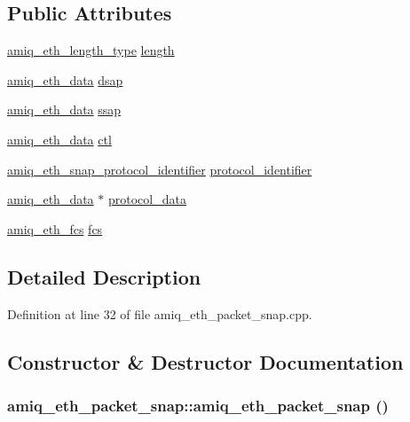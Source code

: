 \subsection*{Public Attributes}
\begin{DoxyCompactItemize}
\item 
\hyperlink{amiq__eth__types_8cpp_a4d2be172e6524c991fe389337947afc0}{amiq\_\-eth\_\-length\_\-type} \hyperlink{classamiq__eth__packet__snap_aab2892c994afa1c55c560ae287f96f19}{length}
\item 
\hyperlink{amiq__eth__types_8cpp_a3595a0a508d433d383d3e5521fc0b723}{amiq\_\-eth\_\-data} \hyperlink{classamiq__eth__packet__snap_a3472137088bb7bc9085610f4f848527f}{dsap}
\item 
\hyperlink{amiq__eth__types_8cpp_a3595a0a508d433d383d3e5521fc0b723}{amiq\_\-eth\_\-data} \hyperlink{classamiq__eth__packet__snap_a6acbe3de6637a59ffae0b491b8567991}{ssap}
\item 
\hyperlink{amiq__eth__types_8cpp_a3595a0a508d433d383d3e5521fc0b723}{amiq\_\-eth\_\-data} \hyperlink{classamiq__eth__packet__snap_ae4146189e20b5d48c0563c0fa575b578}{ctl}
\item 
\hyperlink{amiq__eth__types_8cpp_a8595e88502ca3eddef1de16991a4a6ef}{amiq\_\-eth\_\-snap\_\-protocol\_\-identifier} \hyperlink{classamiq__eth__packet__snap_a248cb95f457543532684f7a86e2481b3}{protocol\_\-identifier}
\item 
\hyperlink{amiq__eth__types_8cpp_a3595a0a508d433d383d3e5521fc0b723}{amiq\_\-eth\_\-data} $\ast$ \hyperlink{classamiq__eth__packet__snap_aef5354d102ccd32cc521388767ca23fe}{protocol\_\-data}
\item 
\hyperlink{amiq__eth__types_8cpp_adb511dc715b55539c6abdad1de981a9f}{amiq\_\-eth\_\-fcs} \hyperlink{classamiq__eth__packet__snap_aca86c29ed386cc63461db470932b70bc}{fcs}
\end{DoxyCompactItemize}


\subsection{Detailed Description}


Definition at line 32 of file amiq\_\-eth\_\-packet\_\-snap.cpp.

\subsection{Constructor \& Destructor Documentation}
\hypertarget{classamiq__eth__packet__snap_a768dde5515c9a9d5ca0cb56b1d01d14b}{
\subsubsection[{amiq\_\-eth\_\-packet\_\-snap}]{\setlength{\rightskip}{0pt plus 5cm}amiq\_\-eth\_\-packet\_\-snap::amiq\_\-eth\_\-packet\_\-snap ()}}
\label{classamiq__eth__packet__snap_a768dde5515c9a9d5ca0cb56b1d01d14b}


